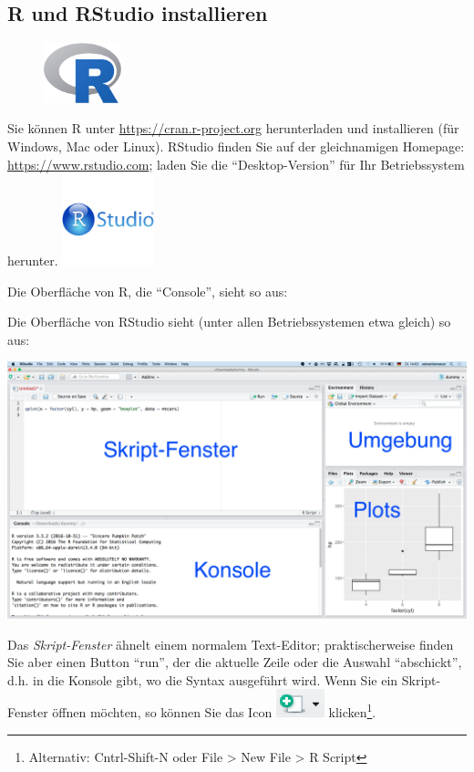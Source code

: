\documentclass[12pt,ngerman,]{book}
\let\rmarkdownfootnote\footnote%
\def\footnote{\protect\rmarkdownfootnote}
\begin{document}
\subsection{R und RStudio
installieren}\label{r-und-rstudio-installieren}

\begin{figure}
\centering
\includegraphics[width=0.20000\textwidth]{images/Rlogo.svg}
\caption{}
\end{figure}

Sie können R unter \url{https://cran.r-project.org} herunterladen und
installieren (für Windows, Mac oder Linux). RStudio finden Sie auf der
gleichnamigen Homepage: \url{https://www.rstudio.com}; laden Sie die
``Desktop-Version'' für Ihr Betriebssystem herunter.
\includegraphics[width=0.20000\textwidth]{images/rstudiologo.png}

Die Oberfläche von R, die ``Console'', sieht so aus:

Die Oberfläche von RStudio sieht (unter allen Betriebssystemen etwa
gleich) so aus:

\begin{center}\includegraphics[width=0.7\linewidth]{images/RStudio-Screenshot} \end{center}

Das \emph{Skript-Fenster} ähnelt einem normalem
Text-Editor; praktischerweise finden Sie aber einen Button ``run'', der
die aktuelle Zeile oder die Auswahl ``abschickt'', d.h. in die Konsole
gibt, wo die Syntax ausgeführt wird. Wenn Sie ein Skript-Fenster öffnen
möchten, so können Sie das Icon \includegraphics{images/new_script.png}
klicken\footnote{Alternativ: Cntrl-Shift-N oder File \textgreater{} New
  File \textgreater{} R Script}.
\end{document}
